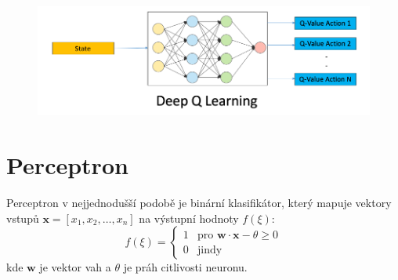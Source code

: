 \documentclass[12pt, a4paper,
twoside,        %
openright
]{report}
\begin{document}
\begin{figure}[h]
	\centering
	\includegraphics[width=0.8\linewidth, height=0.8\linewidth, keepaspectratio]{image/dqlearn.png}
	
\end{figure}

\newpage
\section{Perceptron}
Perceptron v nejjednodušší podobě je binární klasifikátor, který mapuje vektory vstupů 
\(\mathbf{x} = [x_1, x_2, \ldots, x_n]\) na výstupní hodnoty \(f(\xi)\):
\[
f(\xi) = 
\begin{cases} 
	1 & \text{pro } \mathbf{w} \cdot \mathbf{x} - \theta \geq 0 \\
	0 & \text{jindy} 
\end{cases}
\]
kde \(\mathbf{w}\) je vektor vah a \(\theta\) je práh citlivosti neuronu.
\end{document}
